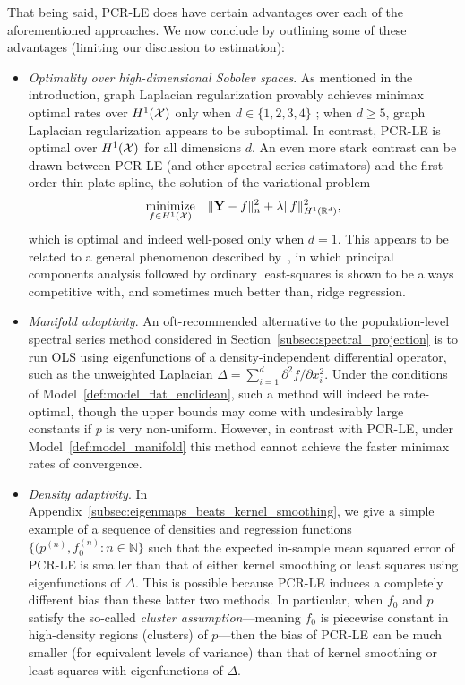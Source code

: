 That being said, PCR-LE does have certain advantages over each of the aforementioned approaches. We now conclude by outlining some of these advantages (limiting our discussion to estimation):
\begin{itemize}
	\item \emph{Optimality over high-dimensional Sobolev spaces}. As mentioned in the introduction, graph Laplacian regularization provably achieves minimax optimal rates over $H^1(\mathcal{X})$ only when $d \in \{1,2,3,4\}$ \citep{sadhanala16, green2021}; when $d \geq 5$, graph Laplacian regularization appears to be suboptimal. In contrast, PCR-LE is optimal over $H^1(\mathcal{X})$ for all dimensions $d$.  An even more stark contrast can be drawn between PCR-LE (and other spectral series estimators) and the first order thin-plate spline, the solution of the variational problem
	\begin{equation}
	\underset{f \in H^1(\mathcal{X})}{\textrm{minimize}} \quad  \|{\bf Y} - f\|_n^2 + \lambda \|f\|_{H^1(\mathbb{R}^d)}^2,
	\end{equation}
	which is optimal and indeed well-posed only when $d = 1$. This appears to be related to a general phenomenon described by~\cite{dhillon2013,dicker2017}, in which principal components analysis followed by ordinary least-squares is shown to be always competitive with, and sometimes much better than, ridge regression. 
	\item \emph{Manifold adaptivity}. An oft-recommended alternative to the population-level spectral series method considered in Section~\ref{subsec:spectral_projection} is to run OLS using eigenfunctions of a density-independent differential operator, such as the unweighted Laplacian $\Delta = \sum_{i = 1}^{d} \partial^2f/\partial x_i^2$. Under the conditions of Model~\ref{def:model_flat_euclidean}, such a method will indeed be rate-optimal, though the upper bounds may come with undesirably large constants if $p$ is very non-uniform. However, in contrast with PCR-LE, under Model~\ref{def:model_manifold} this method cannot achieve the faster minimax rates of convergence.
	\item \emph{Density adaptivity}. In Appendix~\ref{subsec:eigenmaps_beats_kernel_smoothing}, we give a simple example of a sequence of densities and regression functions $\{(p^{(n)}, f_0^{(n)}: n \in \mathbb{N}\}$ such that the expected in-sample mean squared error of PCR-LE is smaller than that of either kernel smoothing or least squares using eigenfunctions of $\Delta$. This is possible because PCR-LE induces a completely different bias than these latter two methods. In particular, when $f_0$ and $p$ satisfy the so-called \emph{cluster assumption}---meaning $f_0$ is piecewise constant in high-density regions (clusters) of $p$---then the bias of PCR-LE can be much smaller (for equivalent levels of variance) than that of kernel smoothing or least-squares with eigenfunctions of $\Delta$. 
	

\end{itemize}
